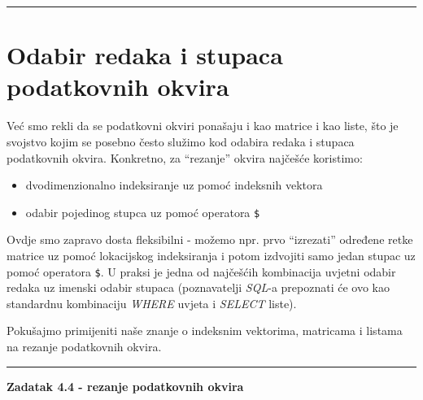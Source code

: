 \documentclass[]{book}
\newenvironment{Shaded}{\begin{snugshade}}{\end{snugshade}}
\newcommand{\CommentTok}[1]{\textcolor[rgb]{0.56,0.35,0.01}{\textit{#1}}}
\providecommand{\tightlist}{%
  \setlength{\itemsep}{0pt}\setlength{\parskip}{0pt}}
\theoremstyle{definition}
\theoremstyle{definition}
\theoremstyle{definition}
\theoremstyle{remark}
\begin{document}
\begin{center}\rule{0.5\linewidth}{\linethickness}\end{center}

\section{Odabir redaka i stupaca podatkovnih
okvira}\label{odabir-redaka-i-stupaca-podatkovnih-okvira}

Već smo rekli da se podatkovni okviri ponašaju i kao matrice i kao
liste, što je svojstvo kojim se posebno često služimo kod odabira redaka
i stupaca podatkovnih okvira. Konkretno, za ``rezanje'' okvira najčešće
koristimo:

\begin{itemize}
\tightlist
\item
  dvodimenzionalno indeksiranje uz pomoć indeksnih vektora
\item
  odabir pojedinog stupca uz pomoć operatora \texttt{\$}
\end{itemize}

Ovdje smo zapravo dosta fleksibilni - možemo npr. prvo ``izrezati''
određene retke matrice uz pomoć lokacijskog indeksiranja i potom
izdvojiti samo jedan stupac uz pomoć operatora \texttt{\$}. U praksi je
jedna od najčešćih kombinacija uvjetni odabir redaka uz imenski odabir
stupaca (poznavatelji \emph{SQL}-a prepoznati će ovo kao standardnu
kombinaciju \emph{WHERE} uvjeta i \emph{SELECT} liste).

Pokušajmo primijeniti naše znanje o indeksnim vektorima, matricama i
listama na rezanje podatkovnih okvira.

\begin{center}\rule{0.5\linewidth}{\linethickness}\end{center}

\textbf{Zadatak 4.4 - rezanje podatkovnih okvira}

\begin{Shaded}
\end{Shaded}
\end{document}
